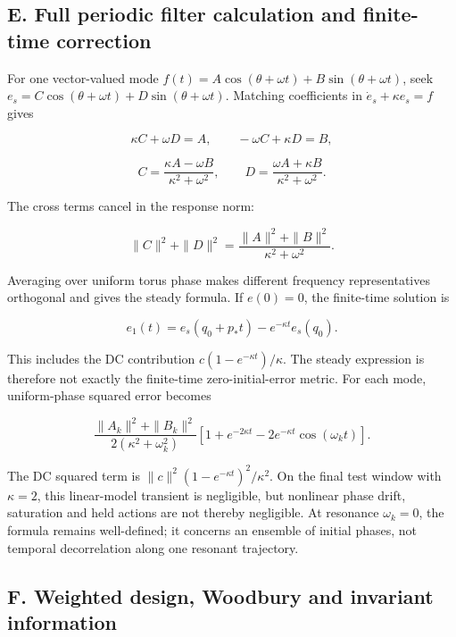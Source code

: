 \documentclass[
  10pt,
]{article}
\begin{document}
\hypertarget{e.-full-periodic-filter-calculation-and-finite-time-correction}{%
\subsection*{E. Full periodic filter calculation and finite-time
correction}\label{e.-full-periodic-filter-calculation-and-finite-time-correction}}

For one vector-valued mode
\(f(t)=A\cos(\theta+\omega t)+B\sin(\theta+\omega t)\), seek
\(e_s=C\cos(\theta+\omega t)+D\sin(\theta+\omega t)\). Matching
coefficients in \(\dot e_s+\kappa e_s=f\) gives

\[\kappa C+\omega D=A,\qquad -\omega C+\kappa D=B,\]

\[C=\frac{\kappa A-\omega B}{\kappa^2+\omega^2},\qquad
D=\frac{\omega A+\kappa B}{\kappa^2+\omega^2}.\]

The cross terms cancel in the response norm:

\[\|C\|^2+\|D\|^2=\frac{\|A\|^2+\|B\|^2}{\kappa^2+\omega^2}.\]

Averaging over uniform torus phase makes different frequency
representatives orthogonal and gives the steady formula. If \(e(0)=0\),
the finite-time solution is

\[e_1(t)=e_s(q_0+p_*t)-e^{-\kappa t}e_s(q_0).\]

This includes the DC contribution \(c(1-e^{-\kappa t})/\kappa\). The
steady expression is therefore not exactly the finite-time
zero-initial-error metric. For each mode, uniform-phase squared error
becomes

\[\frac{\|A_k\|^2+\|B_k\|^2}{2(\kappa^2+\omega_k^2)}
[1+e^{-2\kappa t}-2e^{-\kappa t}\cos(\omega_k t)].\]

The DC squared term is \(\|c\|^2(1-e^{-\kappa t})^2/\kappa^2\). On the
final test window with \(\kappa=2\), this linear-model transient is
negligible, but nonlinear phase drift, saturation and held actions are
not thereby negligible. At resonance \(\omega_k=0\), the formula remains
well-defined; it concerns an ensemble of initial phases, not temporal
decorrelation along one resonant trajectory.

\hypertarget{f.-weighted-design-woodbury-and-invariant-information}{%
\subsection*{F. Weighted design, Woodbury and invariant
information}\label{f.-weighted-design-woodbury-and-invariant-information}}
\end{document}
